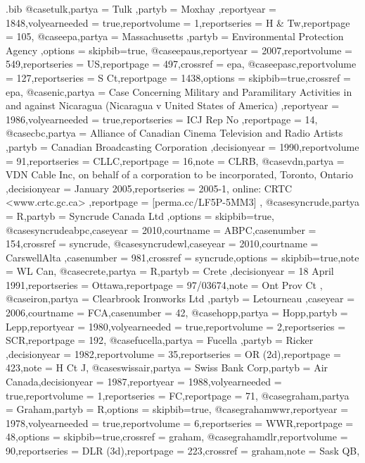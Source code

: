 \begin{filecontents*}[overwrite]{\jobname.bib}
@case{tulk,partya = {Tulk },partyb = {Moxhay },reportyear = {1848},volyearneeded = {true},reportvolume = {1},reportseries = {H \& Tw},reportpage = {105},}
@case{epa,partya = {Massachusetts },partyb = {Environmental Protection Agency },options = {skipbib=true},}
@case{epaus,reportyear = {2007},reportvolume = {549},reportseries = {US},reportpage = {497},crossref = {epa},}
@case{epasc,reportvolume = {127},reportseries = {S Ct},reportpage = {1438},options = {skipbib=true},crossref = {epa},}
@case{nic,partya = {Case Concerning Military and Paramilitary Activities in and against Nicaragua (Nicaragua v United States of America) },reportyear = {1986},volyearneeded = {true},reportseries = {ICJ Rep No },reportpage = {14},}
@case{cbc,partya = {Alliance of Canadian Cinema Television and Radio Artists },partyb = {Canadian Broadcasting Corporation },decisionyear = {1990},reportvolume = {91},reportseries = {CLLC},reportpage = {16},note = {CLRB},}
@case{vdn,partya = {VDN Cable Inc, on behalf of a corporation to be incorporated, Toronto, Ontario },decisionyear = {January 2005},reportseries = {2005-1, online: CRTC <www.crtc.gc.ca> },reportpage = {[perma.cc/LF5P-5MM3] },}
@case{syncrude,partya = {R},partyb = {Syncrude Canada Ltd },options = {skipbib=true},}
@case{syncrudeabpc,caseyear = {2010},courtname = {ABPC},casenumber = {154},crossref = {syncrude},}
@case{syncrudewl,caseyear = {2010},courtname = {CarswellAlta },casenumber = {981},crossref = {syncrude},options = {skipbib=true},note = {WL Can},}
@case{crete,partya = {R},partyb = {Crete },decisionyear = {18 April 1991},reportseries = {Ottawa},reportpage = {97/03674},note = {Ont Prov Ct },}
@case{iron,partya = {Clearbrook Ironworks Ltd },partyb = {Letourneau },caseyear = {2006},courtname = {FCA},casenumber = {42},}
@case{hopp,partya = {Hopp},partyb = {Lepp},reportyear = {1980},volyearneeded = {true},reportvolume = {2},reportseries = {SCR},reportpage = {192},}
@case{fucella,partya = {Fucella },partyb = {Ricker },decisionyear = {1982},reportvolume = {35},reportseries = {OR (2d)},reportpage = {423},note = {H Ct J},}
@case{swissair,partya = {Swiss Bank Corp},partyb = {Air Canada},decisionyear = {1987},reportyear = {1988},volyearneeded = {true},reportvolume = {1},reportseries = {FC},reportpage = {71},}
@case{graham,partya = {Graham},partyb = {R},options = {skipbib=true},}
@case{grahamwwr,reportyear = {1978},volyearneeded = {true},reportvolume = {6},reportseries = {WWR},reportpage = {48},options = {skipbib=true},crossref = {graham},}
@case{grahamdlr,reportvolume = {90},reportseries = {DLR (3d)},reportpage = {223},crossref = {graham},note = {Sask QB},}

\end{filecontents*}
